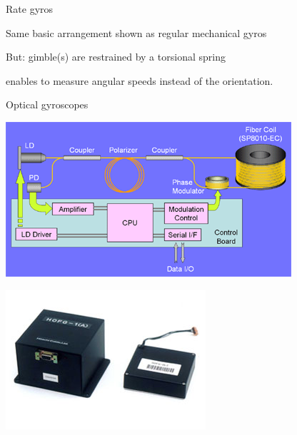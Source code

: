 \documentclass[compress]{beamer}
\begin{document}

\begin{frame}{Rate gyros}

    Same basic arrangement shown as regular mechanical gyros

    But: gimble(s) are restrained by a torsional spring

    \begin{exampleblock}{}
        enables to measure angular speeds instead of the orientation.
    \end{exampleblock}

\end{frame}

\begin{frame}{Optical gyroscopes}

    \begin{multicols}{2}

        \begin{center}
            \includegraphics[width=0.9\linewidth]{optical-gyro}
        \end{center}

        \begin{center}
            \includegraphics[width=0.7\linewidth]{optical-gyro2}
        \end{center}


\end{multicols}
\end{frame}
\end{document}

